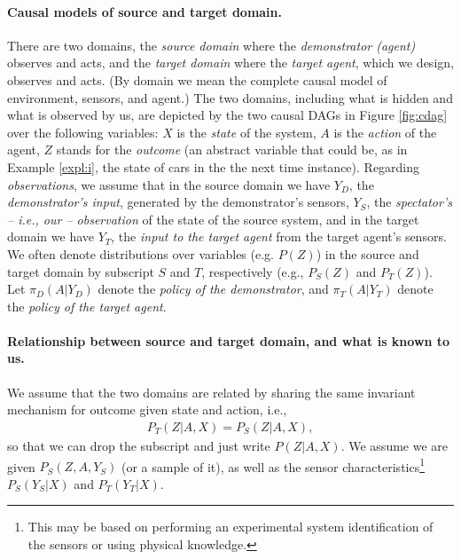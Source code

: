\documentclass[letterpaper]{article} %
\theoremstyle{definition}%
\theoremstyle{definition}
\newcommand{\Obs}{Y}
\newcommand{\Out}{Z}
\newcommand{\todo}[1]{\textcolor{red}{#1}}
\begin{document}
\paragraph{Causal models of source and target domain.} There are two domains, the \emph{source domain} where the \emph{demonstrator (agent)} observes and acts, and the \emph{target domain} where the \emph{target agent}, which we design, observes and acts.
(By domain we mean the complete causal model of environment, sensors, and agent.)
The two domains, including what is hidden and what is observed by us, are depicted by the two causal DAGs in Figure \ref{fig:cdag} over the following variables:
$X$ is the \emph{state} of the system,
$A$ is the \emph{action} of the agent,
$Z$ stands for the \emph{outcome} (an abstract variable that could be, as in Example \ref{expl:i}, the state of cars in the the next time instance). %
Regarding \emph{observations}, we assume that in the source domain we have
$Y_D$, the \emph{demonstrator's input}, generated by the demonstrator's sensors,
$Y_S$, the \emph{spectator's -- i.e., our -- observation} of the state of the source system,
and in the target domain we have
$Y_T$, the \emph{input to the target agent} from the target agent's sensors.
We often denote distributions over variables (e.g. $P(Z)$) in the source and target domain by subscript $S$ and $T$, respectively (e.g., $P_S(Z)$ and $P_T(Z)$).
Let $\pi_D(A|Y_D)$ denote the \emph{policy of the demonstrator},
and  $\pi_T(A|Y_T)$ denote the \emph{policy of the target agent}.

\paragraph{Relationship between source and target domain, and what is known to us.}
We assume that the two domains are related by sharing the same invariant mechanism for outcome given state and action, i.e.,
\begin{align*}
P_T(\Out|A, X)=P_S(\Out|A, X),
\end{align*}
so that we can drop the subscript and just write $P(\Out|A,X)$.
%
We assume we are given $P_S(\Out, A, \Obs_S)$ (or a sample of it), as well as the sensor characteristics\footnote{This may be based on performing an experimental system identification of the sensors or using physical knowledge.} $P_S(Y_S|X)$ and $P_T(Y_T|X)$.
\end{document}
